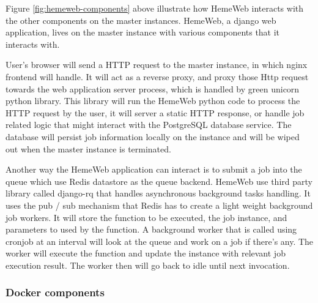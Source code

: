 \vspace{1cm}

Figure \ref{fig:hemeweb-components} above illustrate how HemeWeb interacts with the other components on the master instances. HemeWeb, a django web application, lives on the master instance with various components that it interacts with.

User's browser will send a HTTP request to the master instance, in which nginx frontend will handle.  It will act as a reverse proxy, and proxy those Http request towards the web application server process, which is handled by green unicorn python library. This library will run the HemeWeb python code to process the HTTP request by the user, it will server a static HTTP response, or handle job related logic that might interact with the PostgreSQL database service. The database will persist job information locally on the instance and will be wiped out when the master instance is terminated.

Another way the HemeWeb application can interact is to submit a job into the queue which use Redis datastore as the queue backend. HemeWeb use third party library called django-rq that handles asynchronous background tasks handling. It uses the pub / sub mechanism that Redis has to create a light weight background job workers. It will store the function to be executed, the job instance, and parameters to used by the function. A background worker that is called using cronjob at an interval will look at the queue and work on a job if there's any. The worker will execute the function and update the instance with relevant job execution result. The worker then will go back to idle until next invocation.

\subsubsection{Docker components}

\vspace{1cm}

